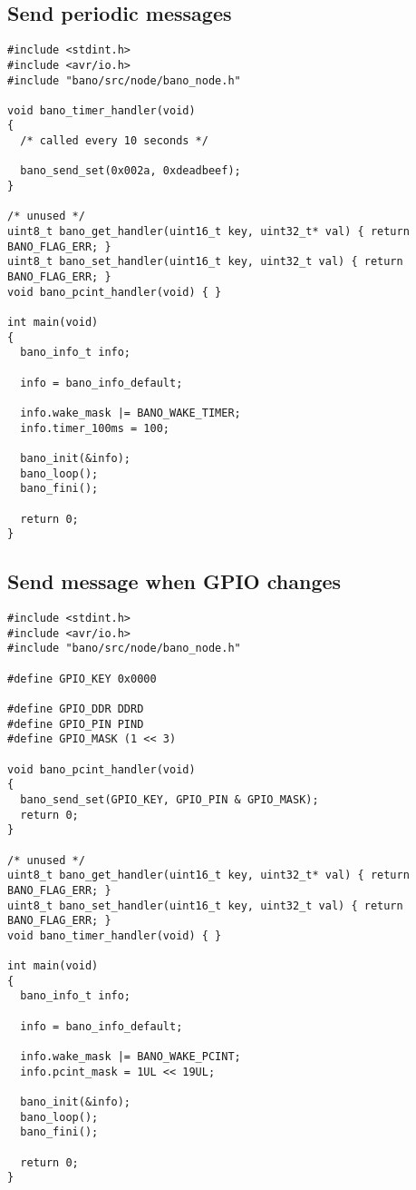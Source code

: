 \documentclass[a4paper, 11pt]{article}
\begin{document}
\clearpage
\subsection{Send periodic messages}
\begin{tiny}
\begin{verbatim}
#include <stdint.h>
#include <avr/io.h>
#include "bano/src/node/bano_node.h"

void bano_timer_handler(void)
{
  /* called every 10 seconds */

  bano_send_set(0x002a, 0xdeadbeef);
}

/* unused */
uint8_t bano_get_handler(uint16_t key, uint32_t* val) { return BANO_FLAG_ERR; }
uint8_t bano_set_handler(uint16_t key, uint32_t val) { return BANO_FLAG_ERR; }
void bano_pcint_handler(void) { }

int main(void)
{
  bano_info_t info;

  info = bano_info_default;

  info.wake_mask |= BANO_WAKE_TIMER;
  info.timer_100ms = 100;

  bano_init(&info);
  bano_loop();
  bano_fini();

  return 0;
}
\end{verbatim}
\end{tiny}


\clearpage
\subsection{Send message when GPIO changes}
\begin{tiny}
\begin{verbatim}
#include <stdint.h>
#include <avr/io.h>
#include "bano/src/node/bano_node.h"

#define GPIO_KEY 0x0000

#define GPIO_DDR DDRD
#define GPIO_PIN PIND
#define GPIO_MASK (1 << 3)

void bano_pcint_handler(void)
{
  bano_send_set(GPIO_KEY, GPIO_PIN & GPIO_MASK);
  return 0;
}

/* unused */
uint8_t bano_get_handler(uint16_t key, uint32_t* val) { return BANO_FLAG_ERR; }
uint8_t bano_set_handler(uint16_t key, uint32_t val) { return BANO_FLAG_ERR; }
void bano_timer_handler(void) { }

int main(void)
{
  bano_info_t info;

  info = bano_info_default;

  info.wake_mask |= BANO_WAKE_PCINT;
  info.pcint_mask = 1UL << 19UL;

  bano_init(&info);
  bano_loop();
  bano_fini();

  return 0;
}
\end{verbatim}
\end{tiny}
\end{document}
